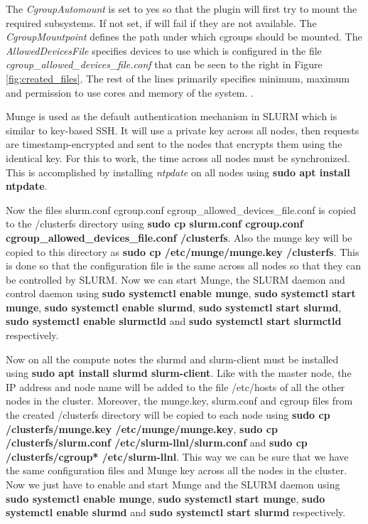 \documentclass[../Head/Report.tex]{subfiles}
\begin{document}
The \textit{CgroupAutomount} is set to yes so that the plugin will first try to mount the required subsystems. If not set, if will fail if they are not available. The \textit{CgroupMountpoint} defines the path under which cgroups should be mounted. The \textit{AllowedDevicesFile} specifies devices to use which is configured in the file \textit{cgroup\_allowed\_devices\_file.conf} that can be seen to the right in Figure \ref{fig:created_files}. The rest of the lines primarily specifies minimum, maximum and permission to use cores and memory of the system. \cite{cgroups} \cite{piCluster}. 

Munge is used as the default authentication mechanism in SLURM which is similar to key-based SSH. It will use a private key across all nodes, then requests are timestamp-encrypted and sent to the nodes that encrypts them using the identical key. For this to work, the time across all nodes must be synchronized. This is accomplished by installing \textit{ntpdate} on all nodes using \textbf{sudo apt install ntpdate}. 

Now the files slurm.conf cgroup.conf cgroup\_allowed\_devices\_file.conf is copied to the /clusterfs directory using \textbf{sudo cp slurm.conf cgroup.conf cgroup\_allowed\_devices\_file.conf /clusterfs}. Also the munge key will be copied to this directory as \textbf{sudo cp /etc/munge/munge.key /clusterfs}. This is done so that the configuration file is the same across all nodes so that they can be controlled by SLURM. Now we can start Munge, the SLURM daemon and control daemon using \textbf{sudo systemctl enable munge}, \textbf{sudo systemctl start munge}, \textbf{sudo systemctl enable slurmd}, \textbf{sudo systemctl start slurmd}, \textbf{sudo systemctl enable slurmctld} and \textbf{sudo systemctl start slurmctld} respectively.

Now on all the compute notes the slurmd and slurm-client must be installed using \textbf{sudo apt install slurmd slurm-client}. Like with the master node, the IP address and node name will be added to the file /etc/hosts of all the other nodes in the cluster. Moreover, the munge.key, slurm.conf and cgroup files from the created /clusterfs directory will be copied to each node using \textbf{sudo cp /clusterfs/munge.key /etc/munge/munge.key}, \textbf{sudo cp /clusterfs/slurm.conf /etc/slurm-llnl/slurm.conf} and \textbf{sudo cp /clusterfs/cgroup* /etc/slurm-llnl}. This way we can be sure that we have the same configuration files and Munge key across all the nodes in the cluster. Now we just have to enable and start Munge and the SLURM daemon using \textbf{sudo systemctl enable munge}, \textbf{sudo systemctl start munge}, \textbf{sudo systemctl enable slurmd} and \textbf{sudo systemctl start slurmd} respectively.
\end{document}
